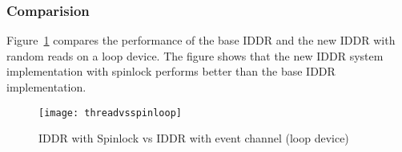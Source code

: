 \subsubsection*{Comparision}
Figure~\ref{fig:threadvsspinloop} compares the performance of the base IDDR and the new IDDR with random reads on a loop device. The figure shows that the new IDDR system implementation with spinlock performs better than the base IDDR implementation. 
\begin{figure}[!ht]
\centering
\texttt{[image: threadvsspinloop]}
\caption{IDDR with Spinlock vs IDDR with event channel (loop device)}
\label{fig:threadvsspinloop}
\end{figure}


